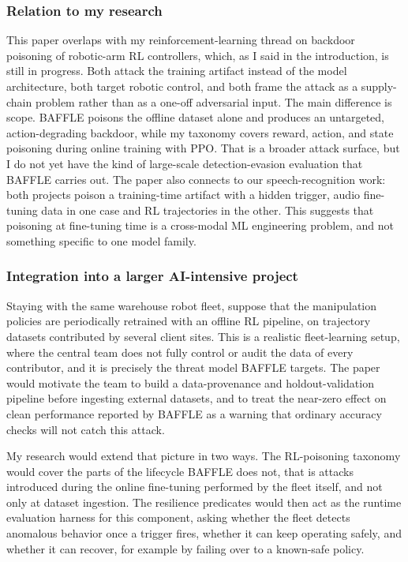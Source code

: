 \documentclass[11pt,a4paper]{article}
\begin{document}
\subsubsection{Relation to my research}

This paper overlaps with my reinforcement-learning thread on backdoor poisoning of robotic-arm RL controllers, which, as I said in the introduction, is still in progress. Both attack the training artifact instead of the model architecture, both target robotic control, and both frame the attack as a supply-chain problem rather than as a one-off adversarial input. The main difference is scope. BAFFLE poisons the offline dataset alone and produces an untargeted, action-degrading backdoor, while my taxonomy covers reward, action, and state poisoning during online training with PPO. That is a broader attack surface, but I do not yet have the kind of large-scale detection-evasion evaluation that BAFFLE carries out. The paper also connects to our speech-recognition work: both projects poison a training-time artifact with a hidden trigger, audio fine-tuning data in one case and RL trajectories in the other. This suggests that poisoning at fine-tuning time is a cross-modal ML engineering problem, and not something specific to one model family.

\subsubsection{Integration into a larger AI-intensive project}

Staying with the same warehouse robot fleet, suppose that the manipulation policies are periodically retrained with an offline RL pipeline, on trajectory datasets contributed by several client sites. This is a realistic fleet-learning setup, where the central team does not fully control or audit the data of every contributor, and it is precisely the threat model BAFFLE targets. The paper would motivate the team to build a data-provenance and holdout-validation pipeline before ingesting external datasets, and to treat the near-zero effect on clean performance reported by BAFFLE as a warning that ordinary accuracy checks will not catch this attack.

My research would extend that picture in two ways. The RL-poisoning taxonomy would cover the parts of the lifecycle BAFFLE does not, that is attacks introduced during the online fine-tuning performed by the fleet itself, and not only at dataset ingestion. The resilience predicates would then act as the runtime evaluation harness for this component, asking whether the fleet detects anomalous behavior once a trigger fires, whether it can keep operating safely, and whether it can recover, for example by failing over to a known-safe policy.
\end{document}
